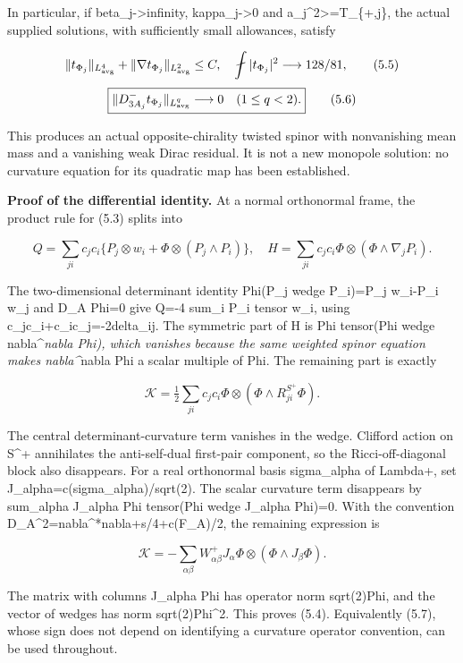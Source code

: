 \documentclass[
  10pt,
]{article}
\begin{document}
In particular, if beta\_j-\textgreater infinity, kappa\_j-\textgreater0
and a\_j\^{}2\textgreater=T\_\{+,j\}, the actual supplied solutions,
with sufficiently small allowances, satisfy

\[
 \|t_{\Phi_j}\|_{L^4_{\rm avg}}+
 \|\nabla t_{\Phi_j}\|_{L^2_{\rm avg}}\le C,
 \quad \fint|t_{\Phi_j}|^2\longrightarrow128/81,
                                                        \tag{5.5}
\] \[
 \boxed{\|D^-_{3A_j}t_{\Phi_j}\|_{L^q_{\rm avg}}
          \longrightarrow0\quad(1\le q<2).}            \tag{5.6}
\]

This produces an actual opposite-chirality twisted spinor with
nonvanishing mean mass and a vanishing weak Dirac residual. It is not a
new monopole solution: no curvature equation for its quadratic map has
been established.

\textbf{Proof of the differential identity.} At a normal orthonormal
frame, the product rule for (5.3) splits into

\[
 Q=\sum_{ji}c_jc_i\{P_j\otimes w_i+
                       \Phi\otimes(P_j\wedge P_i)\},
 \quad H=\sum_{ji}c_jc_i\Phi\otimes(\Phi\wedge\nabla_jP_i).
\]

The two-dimensional determinant identity Phi(P\_j wedge P\_i)=P\_j
w\_i-P\_i w\_j and D\_A Phi=0 give Q=-4 sum\_i P\_i tensor w\_i, using
c\_jc\_i+c\_ic\_j=-2delta\_ij. The symmetric part of H is Phi tensor(Phi
wedge nabla\^{}\emph{nabla Phi), which vanishes because the same
weighted spinor equation makes nabla\^{}}nabla Phi a scalar multiple of
Phi. The remaining part is exactly

\[
 \mathcal K=\tfrac12\sum_{ji}c_jc_i\Phi\otimes
                   (\Phi\wedge R^{S^+}_{ji}\Phi).       \tag{5.7}
\]

The central determinant-curvature term vanishes in the wedge. Clifford
action on S\^{}+ annihilates the anti-self-dual first-pair component, so
the Ricci-off-diagonal block also disappears. For a real orthonormal
basis sigma\_alpha of Lambda+, set J\_alpha=c(sigma\_alpha)/sqrt(2). The
scalar curvature term disappears by sum\_alpha J\_alpha Phi tensor(Phi
wedge J\_alpha Phi)=0. With the convention
D\_A\^{}2=nabla\^{}*nabla+s/4+c(F\_A)/2, the remaining expression is

\[
 \mathcal K=-\sum_{\alpha\beta}W^+_{\alpha\beta}
                  J_\alpha\Phi\otimes(\Phi\wedge J_\beta\Phi).
\]

The matrix with columns J\_alpha Phi has operator norm
sqrt(2)\textbar Phi\textbar, and the vector of wedges has norm
sqrt(2)\textbar Phi\textbar\^{}2. This proves (5.4). Equivalently (5.7),
whose sign does not depend on identifying a curvature operator
convention, can be used throughout.
\end{document}
